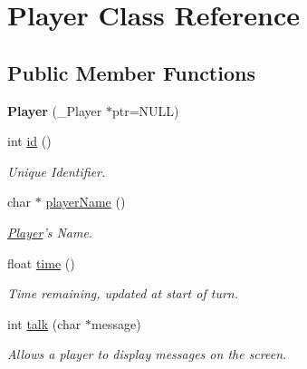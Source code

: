 \hypertarget{classPlayer}{\section{\-Player \-Class \-Reference}
\label{classPlayer}
}
\subsection*{\-Public \-Member \-Functions}
\begin{DoxyCompactItemize}
\item 
\hypertarget{classPlayer_ad6838d275fcdffcff8dde2a53e36841a}{{\bfseries \-Player} (\-\_\-\-Player $\ast$ptr=\-N\-U\-L\-L)}\label{classPlayer_ad6838d275fcdffcff8dde2a53e36841a}

\item 
\hypertarget{classPlayer_a67d6e705fcc8aeb1dcbc8d8daa9f7fa0}{int \hyperlink{classPlayer_a67d6e705fcc8aeb1dcbc8d8daa9f7fa0}{id} ()}\label{classPlayer_a67d6e705fcc8aeb1dcbc8d8daa9f7fa0}

\begin{DoxyCompactList}\small\item\em \-Unique \-Identifier. \end{DoxyCompactList}\item 
\hypertarget{classPlayer_ace60d96b69a81714368b7c89e2a4ae0e}{char $\ast$ \hyperlink{classPlayer_ace60d96b69a81714368b7c89e2a4ae0e}{player\-Name} ()}\label{classPlayer_ace60d96b69a81714368b7c89e2a4ae0e}

\begin{DoxyCompactList}\small\item\em \hyperlink{classPlayer}{\-Player}'s \-Name. \end{DoxyCompactList}\item 
\hypertarget{classPlayer_a058578be4da08eca884c574f327608ea}{float \hyperlink{classPlayer_a058578be4da08eca884c574f327608ea}{time} ()}\label{classPlayer_a058578be4da08eca884c574f327608ea}

\begin{DoxyCompactList}\small\item\em \-Time remaining, updated at start of turn. \end{DoxyCompactList}\item 
\hypertarget{classPlayer_a578597007d7b0dd1e41bba5b80433334}{int \hyperlink{classPlayer_a578597007d7b0dd1e41bba5b80433334}{talk} (char $\ast$message)}\label{classPlayer_a578597007d7b0dd1e41bba5b80433334}

\begin{DoxyCompactList}\small\item\em \-Allows a player to display messages on the screen. \end{DoxyCompactList}\end{DoxyCompactItemize}
